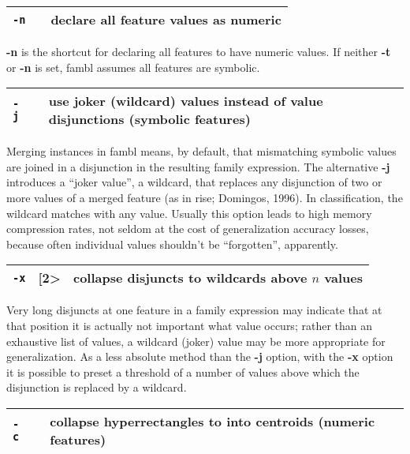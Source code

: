 \documentclass[11pt]{article}
\begin{document}
\begin{tabular}{|p{}|p{}|p{}|}
\hline
{\tt -n} & & declare all feature values as numeric \\
\hline
\end{tabular}

{\bf -n} is the shortcut for declaring all features to have numeric
values. If neither {\bf -t} or {\bf -n} is set, {\sc fambl} assumes
all features are symbolic. 
\ \\

\begin{tabular}{|p{}|p{}|p{}|}
\hline
{\tt -j} & & use joker (wildcard) values instead of value disjunctions 
(symbolic features) \\
\hline
\end{tabular}

Merging instances in {\sc fambl} means, by default, that mismatching
symbolic values are joined in a disjunction in the resulting family
expression. The alternative {\bf -j} introduces a ``joker value'', a
wildcard, that replaces any disjunction of two or more values of a
merged feature (as in {\sc rise}; Domingos, 1996). In classification,
the wildcard matches with any value. Usually this option leads to high
memory compression rates, not seldom at the cost of generalization
accuracy losses, because often individual values shouldn't be
``forgotten'', apparently. 
\ \\

\begin{tabular}{|p{}|p{}|p{}|}
\hline
{\tt -x} & [2>& collapse disjuncts to wildcards above $n$ values \\
\hline
\end{tabular}

Very long disjuncts at one feature in a family expression may indicate
that at that position it is actually not important what value occurs;
rather than an exhaustive list of values, a wildcard (joker) value may
be more appropriate for generalization. As a less absolute method than
the {\bf -j} option, with the {\bf -x} option it is possible to preset
a threshold of a number of values above which the disjunction is
replaced by a wildcard.  \ \\

\begin{tabular}{|p{}|p{}|p{}|}
\hline
{\tt -c} & & collapse hyperrectangles to into centroids (numeric features) \\
\hline
\end{tabular}
\end{document}
